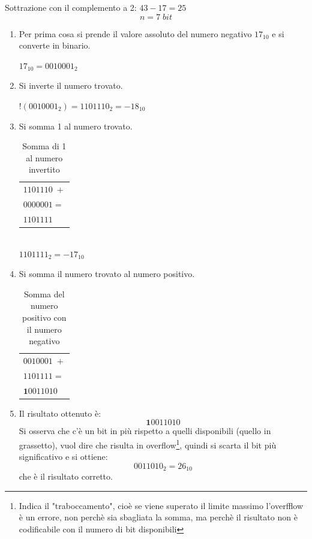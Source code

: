 \documentclass[a4paper]{article}
\theoremstyle{break}
\theoremstyle{break}
\theoremstyle{break}
\theoremstyle{break}
\begin{document}
\begin{example}
	Sottrazione con il complemento a 2: \( 43-17=25 \)
	\[
		n=7 \; bit
	\]
	\begin{enumerate}
		\item Per prima cosa si prende il valore assoluto del numero negativo
		      \( 17_{10} \) e si converte in binario.
		      \begin{center}
			      \( 17_{10}=0010001_{2} \)
		      \end{center}
		\item Si inverte il numero trovato.
		      \begin{center}
			      \( !(0010001_2) = 1101110_2 = -18_{10} \)
		      \end{center}
		\item Si somma 1 al numero trovato.
            \begin{table}[H]
                \begin{center}
                    \begin{tabular}{l}
                        \( 1101110\; + \) \\
                        \( 0000001 = \)   \\
                        \hline
                        \( 1101111 \)
                    \end{tabular}\\
                    \( 1101111_2 = -17_{10} \)
                \end{center}
                \caption{Somma di 1 al numero invertito}
            \end{table}
		\item Si somma il numero trovato al numero positivo.
            \begin{table}[H]
                \begin{center}
                    \begin{tabular}{l}
                        \( 0010001\; + \) \\
                        \( 1101111 = \)   \\
                        \hline
                        \( \textbf{1}0011010 \)
                    \end{tabular}
                \end{center}
               \caption{Somma del numero positivo con il numero negativo} 
            \end{table}
		\item Il risultato ottenuto è: \[
			      \textbf{1}0011010
		      \] Si osserva che c'è un bit in più rispetto a quelli disponibili (quello
		      in grassetto),
		      vuol dire che risulta in overflow\footnote{Indica il "traboccamento",
			      cioè se viene superato il limite massimo l'overfflow è un errore,
			      non perchè sia sbagliata la somma, ma perchè il risultato non è codificabile
			      con il numero di bit disponibili}, quindi si scarta il bit più significativo e
		      si ottiene:\[
			      0011010_2 = 26_{10}
		      \] che è il risultato corretto.
	\end{enumerate}
\end{example}
\end{document}

